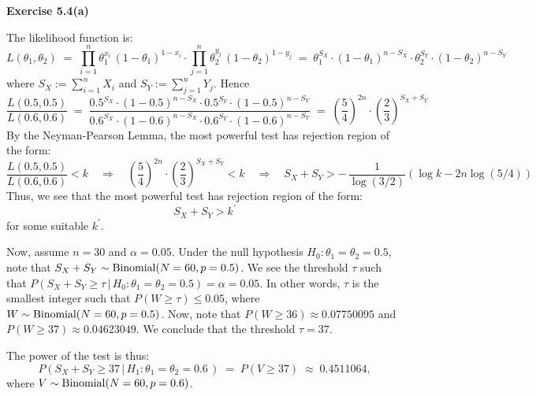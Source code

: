 
\noindent
\textbf{Exercise 5.4(a)}

\vskip 0.3cm
\noindent
The likelihood function is:
\begin{equation*}
L(\theta_{1},\theta_{2})
\;=\; \prod_{i=1}^{n}\theta_{1}^{x_{i}}\,(1-\theta_{1})^{1-x_{i}} \cdot \prod_{j=1}^{n}\theta_{2}^{y_{j}}\,(1-\theta_{2})^{1-y_{j}}
\;=\; \theta_{1}^{S_{X}}\cdot(1-\theta_{1})^{n - S_{X}}\cdot\theta_{2}^{S_{Y}}\cdot(1-\theta_{2})^{n - S_{Y}}
\end{equation*}
where $S_{X} := \sum_{i=1}^{n}X_{i}$ and $S_{Y} := \sum_{j=1}^{n}Y_{j}$.
Hence
\begin{equation*}
\dfrac{L(0.5,0.5)}{L(0.6,0.6)}
\;=\;\dfrac{0.5^{S_{X}}\cdot(1-0.5)^{n - S_{X}}\cdot0.5^{S_{Y}}\cdot(1-0.5)^{n - S_{Y}}}{0.6^{S_{X}}\cdot(1-0.6)^{n - S_{X}}\cdot0.6^{S_{Y}}\cdot(1-0.6)^{n - S_{Y}}}
\;=\;\left(\dfrac{5}{4}\right)^{2n}\cdot\left(\dfrac{2}{3}\right)^{S_{X}+S_{Y}}
\end{equation*}
By the Neyman-Pearson Lemma, the most powerful test has rejection region of the form:
\begin{equation*}
\dfrac{L(0.5,0.5)}{L(0.6,0.6)} < k
\quad\Longrightarrow\quad
\left(\dfrac{5}{4}\right)^{2n}\cdot\left(\dfrac{2}{3}\right)^{S_{X}+S_{Y}} < k
\quad\Longrightarrow\quad
S_{X} + S_{Y} > -\,\dfrac{1}{\log(3/2)}\left(\log k - 2n\log(5/4)\right) 
\end{equation*}
Thus, we see that the most powerful test has rejection region of the form:
\begin{equation*}
S_{X} + S_{Y} > k^{\prime}
\end{equation*}
for some suitable $k^{\prime}$.

\vskip 0.3cm
\noindent
Now, assume $n = 30$ and $\alpha = 0.05$.
Under the null hypothesis $H_{0}: \theta_{1} = \theta_{2} = 0.5$, note that $S_{X} + S_{Y} \sim \textnormal{Binomial}(N=60,p=0.5)$.
We see the threshold $\tau$ such that $P(S_{X} + S_{Y} \geq \tau\,\vert\, H_{0}: \theta_{1}=\theta_{2}=0.5) = \alpha = 0.05$.
In other words, $\tau$ is the smallest integer such that $P(W \geq \tau) \leq 0.05$, where $W \sim \textnormal{Binomial}(N=60,p=0.5)$.
Now, note that $P(W \geq 36) \approx 0.07750095$ and $P(W \geq 37) \approx 0.04623049$. We conclude that the threshold $\tau = 37$.

\vskip 0.3cm
\noindent
The power of the test is thus:
\begin{equation*}
P\!\left(\left.S_{X} + S_{Y} \geq 37 \,\right\vert\,H_{1}:\theta_{1}=\theta_{2}=0.6\,\right)
\;=\; P(V \geq 37) \;\approx\; 0.4511064,
\end{equation*}
where $V \sim \textnormal{Binomial}(N = 60, p = 0.6)$.

